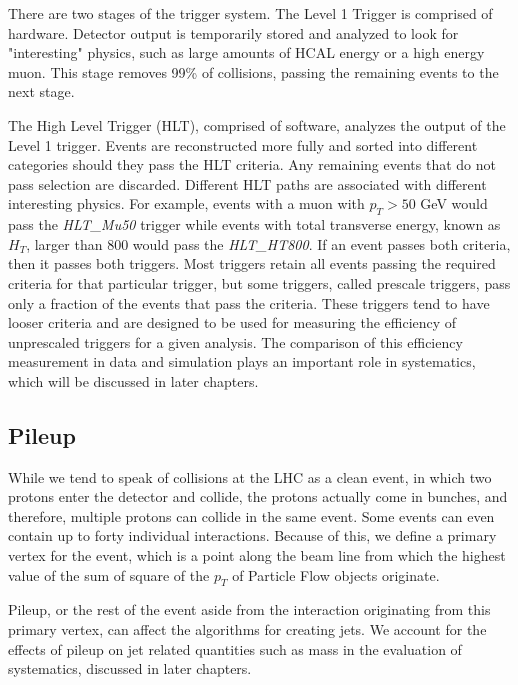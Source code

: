 There are two stages of the trigger system. The Level 1 Trigger is comprised of hardware. Detector output is temporarily stored and analyzed to look for "interesting" physics, such as large amounts of HCAL energy or a high energy muon. This stage removes 99\% of collisions, passing the remaining events to the next stage.

The High Level Trigger (HLT), comprised of software, analyzes the output of the Level 1 trigger. Events are reconstructed more fully and sorted into different categories should they pass the HLT criteria. Any remaining events that do not pass selection are discarded. Different HLT paths are associated with different interesting physics. For example, events with a muon with $p_{T} > 50$ GeV would pass the \textit{HLT\_Mu50} trigger while events with total transverse energy, known as $H_{T}$, larger than 800 would pass the \textit{HLT\_HT800}. If an event passes both criteria, then it passes both triggers. Most triggers retain all events passing the required criteria for that particular trigger, but some triggers, called prescale triggers, pass only a fraction of the events that pass the criteria. These triggers tend to have looser criteria and are designed to be used for measuring the efficiency of unprescaled triggers for a given analysis. The comparison of this efficiency measurement in data and simulation plays an important role in systematics, which will be discussed in later chapters.
\vspace{5mm}

\subsection{Pileup}
While we tend to speak of collisions at the LHC as a clean event, in which two protons enter the detector and collide, the protons actually come in bunches, and therefore, multiple protons can collide in the same event. Some events can even contain up to forty individual interactions. Because of this, we define a primary vertex for the event, which is a point along the beam line from which the highest value of the sum of square of the $p_{T}$ of Particle Flow objects originate. 

Pileup, or the rest of the event aside from the interaction originating from this primary vertex, can affect the algorithms for creating jets. We account for the effects of pileup on jet related quantities such as mass in the evaluation of systematics, discussed in later chapters.
